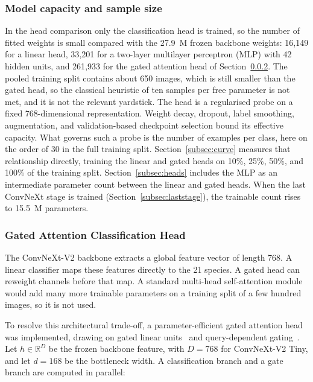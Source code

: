 \documentclass[final,3p,times,twocolumn]{elsarticle}
\begin{document}
\subsubsection{Model capacity and sample size}
\label{subsec:capacity}

In the head comparison only the classification head is trained, so the number of fitted weights is small compared with the 27.9~M frozen backbone weights: 16{,}149 for a linear head, 33{,}201 for a two-layer multilayer perceptron (MLP) with 42 hidden units, and 261{,}933 for the gated attention head of Section~\ref{subsec:gated}. The pooled training split contains about 650 images, which is still smaller than the gated head, so the classical heuristic of ten samples per free parameter is not met, and it is not the relevant yardstick. The head is a regularised probe on a fixed 768-dimensional representation. Weight decay, dropout, label smoothing, augmentation, and validation-based checkpoint selection bound its effective capacity. What governs such a probe is the number of examples per class, here on the order of 30 in the full training split. Section~\ref{subsec:curve} measures that relationship directly, training the linear and gated heads on 10\%, 25\%, 50\%, and 100\% of the training split. Section~\ref{subsec:heads} includes the MLP as an intermediate parameter count between the linear and gated heads. When the last ConvNeXt stage is trained (Section~\ref{subsec:laststage}), the trainable count rises to 15.5~M parameters.

\subsubsection{Gated Attention Classification Head}
\label{subsec:gated}

The ConvNeXt-V2 backbone extracts a global feature vector of length 768. A linear classifier maps these features directly to the 21 species. A gated head can reweight channels before that map. A standard multi-head self-attention module would add many more trainable parameters on a training split of a few hundred images, so it is not used.

To resolve this architectural trade-off, a parameter-efficient gated attention head was implemented, drawing on gated linear units~\cite{Dauphinetal2017} and query-dependent gating~\cite{Qiuetal2025}. Let \(h \in \mathbb{R}^{D}\) be the frozen backbone feature, with \(D=768\) for ConvNeXt-V2 Tiny, and let \(d=168\) be the bottleneck width. A classification branch and a gate branch are computed in parallel:
\end{document}
